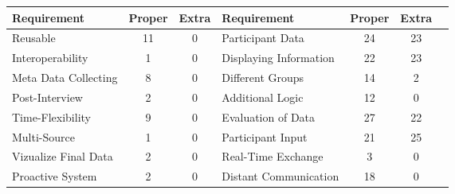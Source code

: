     \begin{table}[htbp]
        \centering
        \small
        \begin{tabular}{lcclccc}
        \hline
        Requirement          & \multicolumn{1}{l}{Proper} & \multicolumn{1}{l}{Extra} & Requirement & \multicolumn{1}{l}{Proper} & \multicolumn{1}{l}{Extra} \\ \hline
        Reusable                                                  & 11                         & 0                         & Participant Data                                           & 24                         & 23                        \\
        Interoperability                                           & 1                          & 0                         & Displaying Information                                     & 22                         & 23                        \\
        Meta Data Collecting                                       & 8                          & 0                         & Different Groups                                           & 14                         & 2                         \\
        Post-Interview                                             & 2                          & 0                         & Additional Logic                                           & 12                         & 0                         \\
        Time-Flexibility                                           & 9                          & 0                         & Evaluation of Data                                         & 27                         & 22                        \\
        Multi-Source                                               & 1                          & 0                         & Participant Input                                          & 21                         & 25                        \\
        Vizualize Final Data                                       & 2                          & 0                         & Real-Time Exchange                                         & 3                          & 0                         \\
        Proactive System                                           & 2                          & 0                         & Distant Communication                                      & 18                         & 0                         \\

\end{tabular}
\end{table}
